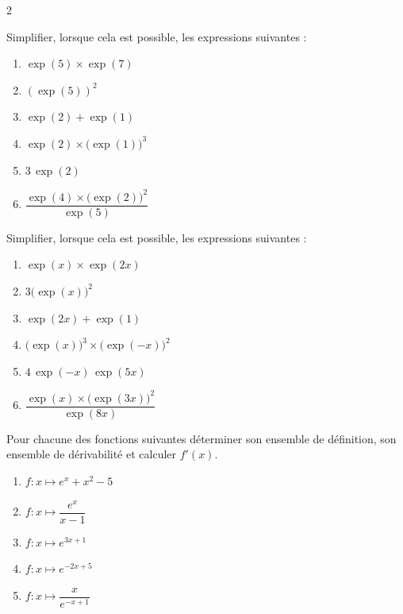 \documentclass[a4paper,12pt]{article}
\title{
\centering
\tcbset{colframe=BlackSav,colback=GrayBG}
\tcbox[tikznode]{
  Chapitre 9 \\Fonction exponentielle
}
}
\author{}
\date{}
\begin{document}
\maketitle

\begin{multicols}{2}

\begin{exercice}[title=Exercice 1 $\star$ { [Calculer] }]{}{}
Simplifier, lorsque cela est possible, les expressions suivantes :
\begin{enumerate}
  \item $\exp(5)\times\exp(7)$
  \item $(\exp(5))^2$
  \item $\exp(2)+\exp(1)$
  \item $\exp(2)\times\bigl(\exp(1)\bigr)^3$
  \item $3\,\exp(2)$
  \item $\dfrac{\exp(4)\times\bigl(\exp(2)\bigr)^2}{\exp(5)}$
\end{enumerate}
\end{exercice}

\begin{exercice}[title=Exercice 2 $\star$ { [Calculer] }]{}{}
Simplifier, lorsque cela est possible, les expressions suivantes :
\begin{enumerate}
  \item $\exp(x)\times\exp(2x)$
  \item $3\bigl(\exp(x)\bigr)^2$
  \item $\exp(2x)+\exp(1)$
  \item $\bigl(\exp(x)\bigr)^3\times\bigl(\exp(-x)\bigr)^2$
  \item $4\,\exp(-x)\,\exp(5x)$
  \item $\dfrac{\exp(x)\times\bigl(\exp(3x)\bigr)^2}{\exp(8x)}$
\end{enumerate}
\end{exercice}

\begin{exercice}[title=Exercice 3 $\star$ { [Calculer] }]{}{}
Pour chacune des fonctions suivantes déterminer son ensemble de définition, son ensemble de dérivabilité et calculer $f'(x)$.
\begin{enumerate}
  \item $f : x \mapsto e^{x} + x^2 - 5$
  \item $f : x \mapsto \dfrac{e^{x}}{x-1}$
  \item $f : x \mapsto e^{3x+1}$
  \item $f : x \mapsto e^{-2x+5}$
  \item $f : x \mapsto \dfrac{x}{e^{-x+1}}$
\end{enumerate}
\end{exercice}


\end{multicols}
\end{document}
